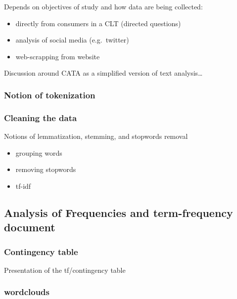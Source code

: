 \documentclass[
]{book}
\providecommand{\tightlist}{%
  \setlength{\itemsep}{0pt}\setlength{\parskip}{0pt}}
\begin{document}
Depends on objectives of study and how data are being collected:

\begin{itemize}
\tightlist
\item
  directly from consumers in a CLT (directed questions)
\item
  analysis of social media (e.g.~twitter)
\item
  web-scrapping from website
\end{itemize}

Discussion around CATA as a simplified version of text analysis\ldots{}

\hypertarget{notion-of-tokenization}{%
\subsubsection{Notion of tokenization}\label{notion-of-tokenization}}

\hypertarget{cleaning-the-data}{%
\subsubsection{Cleaning the data}\label{cleaning-the-data}}

Notions of lemmatization, stemming, and stopwords removal

\begin{itemize}
\tightlist
\item
  grouping words
\item
  removing stopwords
\item
  tf-idf
\end{itemize}

\hypertarget{analysis-of-frequencies-and-term-frequency-document}{%
\subsection{Analysis of Frequencies and term-frequency document}\label{analysis-of-frequencies-and-term-frequency-document}}

\hypertarget{contingency-table}{%
\subsubsection{Contingency table}\label{contingency-table}}

Presentation of the tf/contingency table

\hypertarget{wordclouds}{%
\subsubsection{wordclouds}\label{wordclouds}}
\end{document}
